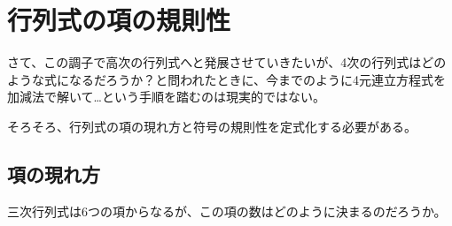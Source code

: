 \documentclass[../../../topic_linear-algebra]{subfiles}
\begin{document}
\sectionline
\section{行列式の項の規則性}

さて、この調子で高次の行列式へと発展させていきたいが、4次の行列式はどのような式になるだろうか？と問われたときに、今までのように4元連立方程式を加減法で解いて…という手順を踏むのは現実的ではない。

そろそろ、行列式の項の現れ方と符号の規則性を定式化する必要がある。

\subsection{項の現れ方}

三次行列式は6つの項からなるが、この項の数はどのように決まるのだろうか。
\end{document}
